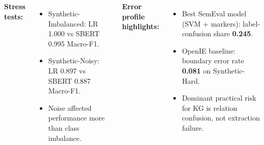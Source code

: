 \documentclass[20pt, a0paper, portrait]{tikzposter} %
\begin{document}
\begin{columns}
{    \vspace{0.2cm}
    \textbf{Stress tests:}
    \begin{itemize}[leftmargin=*, noitemsep]
        \item Synthetic-Imbalanced: LR 1.000 vs SBERT 0.995 Macro-F1.
        \item Synthetic-Noisy: LR 0.897 vs SBERT 0.887 Macro-F1.
        \item Noise affected performance more than class imbalance.
    \end{itemize}

    \vspace{0.2cm}
    \textbf{Error profile highlights:}
    \begin{itemize}[leftmargin=*, noitemsep]
        \item Best SemEval model (SVM + markers): label-confusion share \textbf{0.245}.
        \item OpenIE baseline: boundary error rate \textbf{0.081} on Synthetic-Hard.
        \item Dominant practical risk for KG is relation confusion, not extraction failure.
    \end{itemize}
}

\end{columns}
\end{document}
